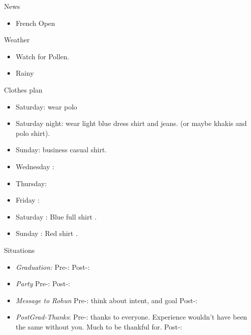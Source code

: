 \documentclass[serif, mathserif, final]{beamer}
\begin{document}
\begin{frame}{}
\begin{columns}
\begin{column}{0.20\linewidth}
  \begin{block}{News}
    \begin{itemize} 
      \tiny \item \tiny French Open
    \end{itemize}
  \end{block}
  \begin{block}{Weather} 
    \begin{itemize}
      \tiny \item \tiny Watch for Pollen.
    \item \tiny Rainy 
    \end{itemize}
  \end{block} 
  \begin{block}{Clothes plan} 
    \begin{itemize} 
      \tiny \item \tiny Saturday: wear polo 
    \item \tiny Saturday night: wear light blue dress shirt and jeans. (or maybe khakis and polo shirt). 
    \item \tiny Sunday: business casual shirt. 
    \item \tiny Wednesday : 
    \item \tiny Thursday: 
    \item \tiny Friday : 
    \item \tiny Saturday : Blue full shirt . 
    \item \tiny Sunday : Red shirt .
    \end{itemize} 
  \end{block}

  \begin{block}{Situations}
    \begin{itemize}
      \item \tiny \textit{Graduation:} Pre-:   Post-: 
      \item \tiny \textit{Party } Pre-:  Post-:

      \item \tiny \textit{Message to Rohun} Pre-: think about intent,
        and goal Post-: 
        \item \tiny \textit{PostGrad-Thanks}: Pre-: thanks to
          everyone. Experience wouldn't have been the same without
          you. Much to be thankful for. Post-: %





\end{itemize}
\end{block}
\end{column}
\end{columns}
\end{frame}
\end{document}

